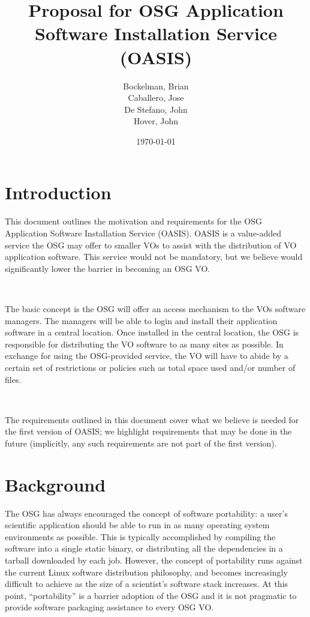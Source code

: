 \documentclass{article}
\title{Proposal for OSG Application Software Installation Service (OASIS)}
\date{\today}
\author{
    Bockelman, Brian \\
    Caballero, Jose \\
    De Stefano, John \\
    Hover, John
}
\begin{document}
\maketitle 

\section{Introduction}

This document outlines the motivation and requirements for the OSG Application Software Installation Service (OASIS).  
OASIS is a value-added service the OSG may offer to smaller VOs to assist with the distribution of VO application software.  
This service would not be mandatory, but we believe would significantly lower the barrier in becoming an OSG VO.

~

The basic concept is the OSG will offer an access mechanism to the VOs software managers.  
The managers will be able to login and install their application software in a central location.  
Once installed in the central location, the OSG is responsible for distributing the VO software to as many sites as possible.  
In exchange for using the OSG-provided service, 
the VO will have to abide by a certain set of restrictions or policies such as total space used and/or number of files.

~

The requirements outlined in this document cover what we believe is needed for the first version of OASIS; 
we highlight requirements that may be done in the future (implicitly, 
any such requirements are not part of the first version).

\section{Background}

The OSG has always encouraged the concept of software portability: 
a user’s scientific application should be able to run in as many operating system environments as possible.  
This is typically accomplished by compiling the software into a single static binary, 
or distributing all the dependencies in a tarball downloaded by each job.  
However, the concept of portability runs against the current Linux software distribution philosophy, 
and becomes increasingly difficult  to achieve as the size of a scientist’s software stack increases.  
At this point, “portability” is a barrier adoption of the OSG and 
it is not pragmatic to provide software packaging assistance to every OSG VO.
\end{document}
